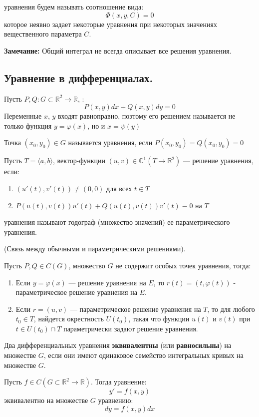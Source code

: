   уравнения будем называть соотношение вида:
$$\varPhi(x,y,C) = 0$$
которое неявно задает некоторые уравнения при некоторых значениях вещественного параметра $C$.

\textbf{Замечание:} Общий интеграл не всегда описывает все решения уравнения.



\subsection{Уравнение в дифференциалах.}

 Пусть $P,Q: G \subset \mathbb{R}^2 \rightarrow \mathbb{R}$, :
$$P(x,y)dx +Q(x,y) dy = 0$$
  Переменные $x$, $y$ входят равноправно, поэтому его решением называется не только функция $y= \varphi(x)$, но и $x = \psi(y)$

 Точка  $(x_0,y_0) \in G$ называется  уравнения, если $P(x_0,y_0) = Q(x_0,y_0) = 0$

 Пусть $T = \langle a,b\rangle$, вектор-функции $(u,v)\in \mathbb{C}^1(T\rightarrow \mathbb{R}^2)$ ---  решение уравнения, если:
\begin{enumerate}
    \item $(u'(t),v'(t)) \neq (0,0)$ для всех $t \in T$
    \item $P(u(t),v(t)) u'(t) + Q(u(t),v(t))v'(t) \equiv 0$ на $T$
\end{enumerate}

   уравнения называют годограф (множество значений) ее параметрического уравнения. 

 (Связь между обычными и параметрическими решениями). 

Пусть $P,Q \in C(G)$, множество $G$ не содержит особых точек уравнения, тогда:
\begin{enumerate}
    \item Если $y = \varphi(x)$ --- решение уравнения на $E$, то $r(t) = (t, \varphi(t))$ - параметрическое решение уравнения на $E$.
    \item Если $r= (u,v)$ --- параметрическое  решение уравнения на $T$, то для любого $t_0 \in T$, найдется окрестность $U(t_0)$, такая что функции $u(t)$ и $v(t)$ при $t\in U(t_0)\cap T$ параметрически задают решение уравнения.
\end{enumerate}

 Два дифференциальных уравнения \textbf{эквивалентны} (или \textbf{равносильны}) на множестве $G$, если они имеют одинаковое семейство интегральных кривых на множестве $G$.

 Пусть $f \in C(G\subset \mathbb{R}^2 \rightarrow \mathbb{R})$. Тогда уравнение:
$$y' = f(x,y)$$
эквивалентно на множестве $G$ уравнению:
$$dy = f(x,y) dx$$